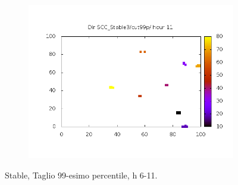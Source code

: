 \documentclass[10pt,a4paper]{article}
\begin{document}
\begin{figure}
\begin{subfigure}[b]{1\textwidth}
\includegraphics[scale=.4]{./img/SCC_Stable3/cut99p/11.png}
\end{subfigure}
\caption{Stable, Taglio 99-esimo percentile, h 6-11.}
\label{stable-99-612}
\end{figure}
\end{document}
